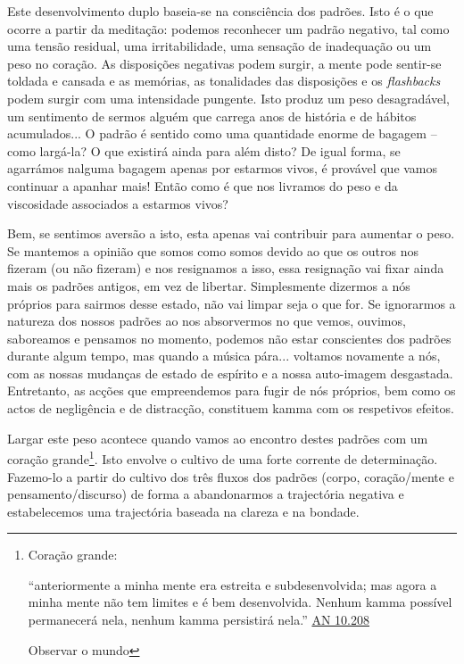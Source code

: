 Este desenvolvimento duplo baseia-se na consciência dos padrões. Isto é o que ocorre a partir da meditação: podemos reconhecer um padrão negativo, tal como uma tensão residual, uma irritabilidade, uma sensação de inadequação ou um peso no coração. As disposições negativas podem surgir, a mente pode sentir-se toldada e cansada e as memórias, as tonalidades das disposições e os \emph{flashbacks} podem surgir com uma intensidade pungente. Isto produz um peso desagradável, um sentimento de sermos alguém que carrega anos de história e de hábitos acumulados... O padrão é sentido como uma quantidade enorme de bagagem -- como largá-la? O que existirá ainda para além disto? De igual forma, se agarrámos nalguma bagagem apenas por estarmos vivos, é provável que vamos continuar a apanhar mais! Então como é que nos livramos do peso e da viscosidade associados a estarmos vivos?

Bem, se sentimos aversão a isto, esta apenas vai contribuir para aumentar o peso. Se mantemos a opinião que somos como somos devido ao que os outros nos fizeram (ou não fizeram) e nos resignamos a isso, essa resignação vai fixar ainda mais os padrões antigos, em vez de libertar. Simplesmente dizermos a nós próprios para sairmos desse estado, não vai limpar seja o que for. Se ignorarmos a natureza dos nossos padrões ao nos absorvermos no que vemos, ouvimos, saboreamos e pensamos no momento, podemos não estar conscientes dos padrões durante algum tempo, mas quando a música pára... voltamos novamente a nós, com as nossas mudanças de estado de espírito e a nossa auto-imagem desgastada. Entretanto, as acções que empreendemos para fugir de nós próprios, bem como os actos de negligência e de distracção, constituem kamma com os respetivos efeitos.

Largar este peso acontece quando vamos ao encontro destes padrões com um coração grande\footnote{Coração grande:

  ``anteriormente a minha mente era estreita e subdesenvolvida; mas agora a minha mente não tem limites e é bem desenvolvida. Nenhum kamma possível permanecerá nela, nenhum kamma persistirá nela.'' \href{https://suttacentral.net/an10.219/en/bodhi}{AN 10.208}

  Observar o mundo}. Isto envolve o cultivo de uma forte corrente de determinação. Fazemo-lo a partir do cultivo dos três fluxos dos padrões (corpo, coração/mente e pensamento/discurso) de forma a abandonarmos a trajectória negativa e estabelecemos uma trajectória baseada na clareza e na bondade.

